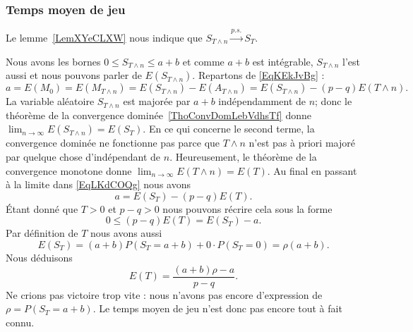 \subsubsection{Temps moyen de jeu}

Le lemme~\ref{LemXYeCLXW} nous indique que \( S_{T\wedge n}\stackrel{p.s.}{\longrightarrow}S_T\).

Nous avons les bornes \( 0\leq S_{T\wedge n}\leq a+b\) et comme \( a+b\) est intégrable, \( S_{T\wedge n}\) l'est aussi et nous pouvons parler de \( E(S_{T\wedge n})\). Repartons de \eqref{EqKEkJvBg} :
\begin{equation}    \label{EqLKdCOQg}
    a=E(M_0)=E(M_{T\wedge n})=E(S_{T\wedge n})-E(A_{T\wedge n})=E(S_{T\wedge n})-(p-q)E(T\wedge n).
\end{equation}
La variable aléatoire \( S_{T\wedge n}\) est majorée par \( a+b\) indépendamment de \( n\); donc le théorème de la convergence dominée~\ref{ThoConvDomLebVdhsTf} donne \( \lim_{n\to \infty} E(S_{T\wedge n})=E(S_T)\). En ce qui concerne le second terme, la convergence dominée ne fonctionne pas parce que \( T\wedge n\) n'est pas à priori majoré par quelque chose d'indépendant de \( n\). Heureusement, le théorème de la convergence monotone donne \( \lim_{n\to \infty} E(T\wedge n)=E(T)\). Au final en passant à la limite dans \eqref{EqLKdCOQg} nous avons
\begin{equation}
    a=E(S_T)-(p-q)E(T).
\end{equation}
Étant donné que \( T>0\) et \( p-q>0\) nous pouvons récrire cela sous la forme
\begin{equation}
    0\leq (p-q)E(T)=E(S_T)-a.
\end{equation}
Par définition de \( T\) nous avons aussi
\begin{equation}
    E(S_T)=(a+b)P(S_T=a+b)+0\cdot P(S_T=0)=\rho(a+b).
\end{equation}
Nous déduisons
\begin{equation}    \label{EqRHUVuKv}
    E(T)=\frac{ (a+b)\rho-a }{ p-q }.
\end{equation}
Ne crions pas victoire trop vite : nous n'avons pas encore d'expression de \( \rho=P(S_T=a+b)\). Le temps moyen de jeu n'est donc pas encore tout à fait connu.

